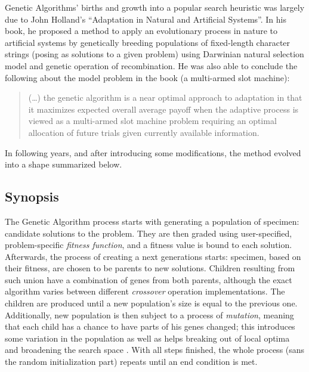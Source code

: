 Genetic Algorithms' births and growth into a popular search heuristic was largely due to John Holland's ``Adaptation in Natural and Artificial Systems''. In his book, he proposed a method to apply an evolutionary process in nature to artificial systems by genetically breeding populations of fixed-length character strings (posing as solutions to a given problem) using Darwinian natural selection model and genetic operation of recombination. He was also able to conclude the following about the model problem in the book (a multi-armed slot machine)\cite{kozagp}:
\begin{quote}
    (\ldots) the genetic algorithm is a near optimal approach to adaptation in that it maximizes expected overall average payoff when the adaptive process is viewed as a multi-armed slot machine problem requiring an optimal allocation of future trials given currently available information.
\end{quote}
In following years, and after introducing some modifications, the method evolved into a shape summarized below.
\subsection{Synopsis}
The Genetic Algorithm process starts with generating a population of specimen: candidate solutions to the problem. They are then graded using user-specified, problem-specific \textit{fitness function}, and a fitness value is bound to each solution. Afterwards, the process of creating a next generations starts: specimen, based on their fitness, are chosen to be parents to new solutions. Children resulting from such union have a combination of genes from both parents, although the exact algorithm varies between different \textit{crossover} operation implementations. The children are produced until a new population's size is equal to the previous one. Additionally, new population is then subject to a process of \textit{mutation}, meaning that each child has a chance to have parts of his genes changed; this introduces some variation in the population as well as helps breaking out of local optima and broadening the search space \cite{Luke2013Metaheuristics}. With all steps finished, the whole process (sans the random initialization part) repeats until an end condition is met.

